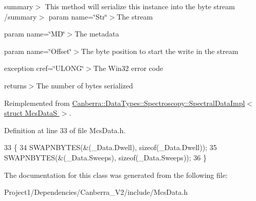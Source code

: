 summary$>$ This method will serialize this instance into the byte stream /summary$>$ param name=\char`\"{}\+Str\char`\"{}$>$The stream

param name=\char`\"{}\+M\+D\char`\"{}$>$The metadata

param name=\char`\"{}\+Offset\char`\"{}$>$The byte position to start the write in the stream

exception cref=\char`\"{}\+U\+L\+O\+N\+G\char`\"{}$>$The Win32 error code

returns$>$The number of bytes serialized

Reimplemented from \hyperlink{class_canberra_1_1_data_types_1_1_spectroscopy_1_1_spectral_data_impl_add8a76fab9523229280ad47efb9b5bf0_add8a76fab9523229280ad47efb9b5bf0}{Canberra\+::\+Data\+Types\+::\+Spectroscopy\+::\+Spectral\+Data\+Impl$<$ struct Mcs\+Data\+S $>$}.



Definition at line 33 of file Mcs\+Data.\+h.


\begin{DoxyCode}
33                                         \{
34                     SWAPNBYTES(&(\_Data.Dwell), \textcolor{keyword}{sizeof}(\_Data.Dwell));
35                     SWAPNBYTES(&(\_Data.Sweeps), \textcolor{keyword}{sizeof}(\_Data.Sweeps));
36                 \}
\end{DoxyCode}


The documentation for this class was generated from the following file\+:\begin{DoxyCompactItemize}
\item 
Project1/\+Dependencies/\+Canberra\+\_\+\+V2/include/Mcs\+Data.\+h\end{DoxyCompactItemize}
